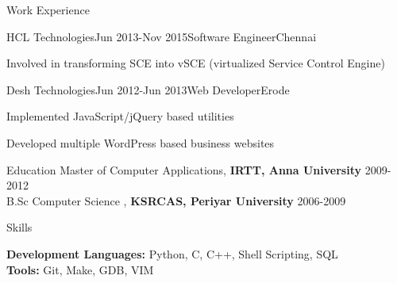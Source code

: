 \documentclass{resume} %
\begin{document}
\begin{rSection}{ Work Experience }
\begin{rSubsection}{HCL Technologies}{Jun 2013-Nov 2015}{Software Engineer}{Chennai}
\item Involved in transforming SCE into vSCE (virtualized Service Control Engine)

\end{rSubsection} 

\vspace{-4pt}


\begin{rSubsection}{Desh Technologies}{Jun 2012-Jun 2013}{Web Developer}{Erode}    

\vspace{-3pt}

\item Implemented JavaScript/jQuery based utilities 
\item Developed multiple WordPress based business websites

\end{rSubsection} 

 
\end{rSection}


\begin{rSection}{Education}
{ Master of Computer Applications, \textbf{IRTT, Anna University}} \hfill {2009-2012}
\\
{ B.Sc Computer Science , \textbf{KSRCAS, Periyar University}} \hfill {2006-2009}

  


\end{rSection} 


\begin{rSection}{Skills} \itemsep -3pt  

{\textbf{Development Languages:} Python, C, C++, Shell Scripting, SQL }  \\
{\textbf{Tools:} Git, Make, GDB, VIM} 
\end{rSection}  
 
\end{document}
